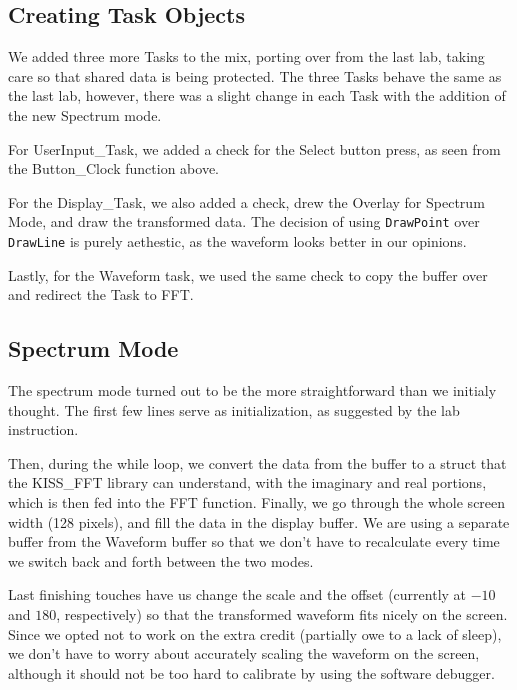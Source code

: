 \documentclass[12pt,oneside,letterpaper]{article}
\begin{document}
\subsection{Creating Task Objects}
We added three more Tasks to the mix, porting over from the last lab, taking care so that shared data is being protected. The three Tasks behave the same as the last lab, however, there was a slight change in each Task with the addition of the new Spectrum mode.

For UserInput\_Task, we added a check for the Select button press, as seen from the Button\_Clock function above. 



For the Display\_Task, we also added a check, drew the Overlay for Spectrum Mode, and draw the transformed data. The decision of using \texttt{DrawPoint} over \texttt{DrawLine} is purely aethestic, as the waveform looks better in our opinions.



Lastly, for the Waveform task, we used the same check to copy the buffer over and redirect the Task to FFT. 


\subsection{Spectrum Mode}
The spectrum mode turned out to be the more straightforward than we initialy thought. The first few lines serve as initialization, as suggested by the lab instruction.

 

Then, during the while loop, we convert the data from the buffer to a struct that the KISS\_FFT library can understand, with the imaginary and real portions, which is then fed into the FFT function. Finally, we go through the whole screen width (128 pixels), and fill the data in the display buffer. We are using a separate buffer from the Waveform buffer so that we don't have to recalculate every time we switch back and forth between the two modes. 



Last finishing touches have us change the scale and the offset (currently at $-10$ and $180$, respectively) so that the transformed waveform fits nicely on the screen. Since we opted not to work on the extra credit (partially owe to a lack of sleep), we don't have to worry about accurately scaling the waveform on the screen, although it should not be too hard to calibrate by using the software debugger.
\end{document}
